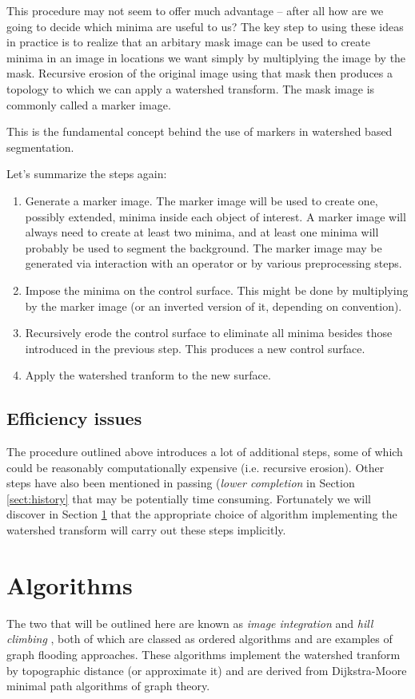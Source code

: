 \documentclass{InsightArticle}
\begin{document}
This procedure may not seem to offer much advantage -- after all how
are we going to decide which minima are useful to us? The key step to
using these ideas in practice is to realize that an arbitary mask
image can be used to create minima in an image in locations we want
simply by multiplying the image by the mask. Recursive erosion of the
original image using that mask then produces a topology to which we
can apply a watershed transform. The mask image is commonly called a
marker image.

This is the fundamental concept behind the use of markers in watershed
based segmentation.

Let's summarize the steps again:

\begin{enumerate}
\item Generate a marker image. The marker image will be used to create 
one, possibly extended, minima inside each object of interest. A
marker image will always need to create at least two minima, and at
least one minima will probably be used to segment the background. The
marker image may be generated via interaction with an operator or by
various preprocessing steps.
\item \label{recipe:min}Impose the minima on the control surface. This 
might be done by multiplying by the marker image (or an inverted
version of it, depending on convention).
\item \label{recipe:erode}Recursively erode the control surface to eliminate all minima besides those introduced in the previous step. This produces a new control surface.
\item Apply the watershed tranform to the new surface.
\end{enumerate}

\subsection{Efficiency issues}
The procedure outlined above introduces a lot of additional steps,
some of which could be reasonably computationally expensive
(i.e. recursive erosion). Other steps have also been mentioned in
passing ({\em lower completion} in Section \ref{sect:history} that may
be potentially time consuming. Fortunately we will discover in Section
\ref{sect:algorithms} that the appropriate choice of algorithm implementing the
watershed transform will carry out these steps implicitly.

\section{Algorithms}
\label{sect:algorithms}
The two that will be outlined here are known as {\em image
integration}\cite{Meyer1994a} and {\em hill climbing}
\cite{Beucher93a}, both of which are classed as ordered
algorithms and are examples of graph flooding approaches. These
algorithms implement the watershed tranform by topographic distance
(or approximate it) and are derived from Dijkstra-Moore minimal path
algorithms of graph theory.
\end{document}

